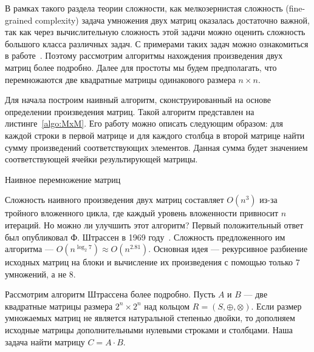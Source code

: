 В рамках такого раздела теории сложности, как мелкозернистая сложность (fine-grained complexity) задача умножения двух матриц оказалась достаточно важной, так как через вычислительную сложность этой задачи можно оценить сложность большого класса различных задач. С примерами таких задач можно ознакомиться в работе~. Поэтому рассмотрим алгоритмы нахождения произведения двух матриц более подробно. Далее для простоты мы будем предполагать, что перемножаются две квадратные матрицы одинакового размера $n \times n$.

Для начала построим наивный алгоритм, сконструированный на основе определении произведения матриц. Такой алгоритм представлен на листинге~\ref{algo:MxM}. Его работу можно описать следующим образом: для каждой строки в первой матрице и для каждого столбца в второй матрице найти сумму произведений соответствующих элементов. Данная сумма будет значением соответствующей ячейки результирующей матрицы.

\begin{algorithm}
	\begin{algorithmic}[1]\label{algo:MxM}
		\caption{Наивное перемножение матриц}
		\EndFor
		\EndFor
		\EndFor

		\EndFunction
	\end{algorithmic}
\end{algorithm}

Сложность наивного произведения двух матриц составляет $O(n^3)$ из-за тройного вложенного цикла, где каждый уровень вложенности привносит $n$ итераций. Но можно ли улучшить этот алгоритм? Первый положительный ответ был опубликовал Ф. Штрассен в 1969 году~. Сложность предложенного им алгоритма --- $O(n^{\log_2 7}) \approx O(n^{2.81})$. Основная идея --- рекурсивное разбиение исходных матриц на блоки и вычисление их произведения с помощью только 7 умножений, а не 8.

Рассмотрим алгоритм Штрассена более подробно. Пусть $A$ и $B$ --- две квадратные матрицы размера $2^n \times 2^n$ над кольцом $R=(S,\oplus,\otimes)$. Если размер умножаемых матриц не является натуральной степенью двойки, то дополняем исходные матрицы дополнительными нулевыми строками и столбцами. Наша задача найти матрицу $C = A \cdot B$.

